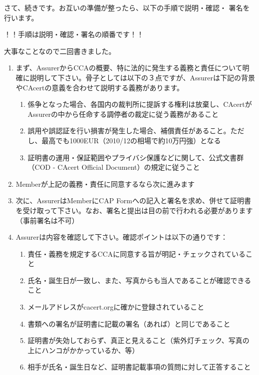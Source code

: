 \documentclass[mingoth,a4paper]{jsarticle}
\begin{document}
さて、続きです。お互いの準備が整ったら、以下の手順で説明・確認・
署名を行います。
\begin{center}
\Large{！！手順は説明・確認・署名の順番です！！}
\end{center}
大事なことなので二回書きました。
\begin{enumerate}
\item まず、AssurerからCCAの概要、特に法的に発生する義務と責任について明確に説明して下さい。骨子としては以下の３点ですが、Assurerは下記の背景やCAcertの意義を合わせて説明する義務があります。
\begin{enumerate}
\item 係争となった場合、各国内の裁判所に提訴する権利は放棄し、CAcertがAssurerの中から任命する調停者の裁定に従う義務があること
\item 誤用や誤認証を行い損害が発生した場合、補償責任があること。ただし、最高でも1000EUR（2010/12の相場で約10万円強）となる
\item 証明書の運用・保証範囲やプライバシ保護などに関して、公式文書群（COD - CAcert Official Document）の規定に従うこと
\end{enumerate}

\item Memberが上記の義務・責任に同意するなら次に進みます
\item 次に、AssurerはMemberにCAP Formへの記入と署名を求め、併せて証明書を受け取って下さい。なお、署名と提出は目の前で行われる必要があります（事前署名は不可）

\item Assurerは内容を確認して下さい。確認ポイントは以下の通りです：
\begin{enumerate}
\item 責任・義務を規定するCCAに同意する旨が明記・チェックされていること
\item 氏名・誕生日が一致し、また、写真からも当人であることが確認できること
\item メールアドレスがcacert.orgに確かに登録されていること
\item 書類への署名が証明書に記載の署名（あれば）と同じであること
\item 証明書が失効しておらず、真正と見えること（紫外灯チェック、写真の上にハンコがかかっているか、等）
\item 相手が氏名・誕生日など、証明書記載事項の質問に対して正答すること
\end{enumerate}


\end{enumerate}
\end{document}
